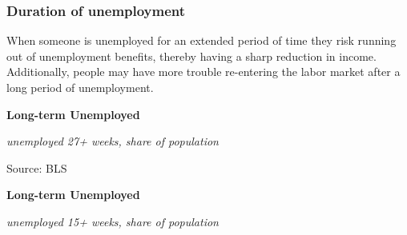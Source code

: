 \documentclass{report}
\makeatletter
\newcommand{\tbllink}[1]{\href{https://raw.githubusercontent.com/bdecon/US-chartbook/master/chartbook/data/#1}{\faTable}}
\newcommand*\short[1]{\expandafter\@gobbletwo\number\numexpr#1\relax}
\newcommand{\shdateaxisticks}{
		date coordinates in=x, axis line style={draw=none},
		xmax={2021-01-01},
		max space between ticks=40,	    
		xtick={{1990-01-01}, {1995-01-01}, {2000-01-01}, 
			{2005-01-01}, {2010-01-01}, {2015-01-01}, {2020-01-01}},
		minor xtick={},
		enlarge y limits={0.06}, enlarge x limits={0.01},
		}
\newcommand{\bbar}[2]{extra #1 ticks = {{#2}}, extra #1 tick labels = ,
		extra #1 tick style = {grid=major, grid style={thick, black!25}},}
\newcommand{\stdline}[4]{\addplot[very thick, no markers, color=#1] 
		table [x=#2, y=#3, col sep=comma] {#4};	}
\newcommand{\rbars}{
		\fill[color=black!10] (axis cs:{1990-07-01},\pgfkeysvalueof{/pgfplots/ymin}) rectangle 
			(axis cs:{1991-03-01}, \pgfkeysvalueof{/pgfplots/ymax});
		\fill[color=black!10] (axis cs:{2007-12-01},\pgfkeysvalueof{/pgfplots/ymin}) rectangle 
			(axis cs:{2009-07-01}, \pgfkeysvalueof{/pgfplots/ymax});
		\fill[color=black!10] (axis cs:{2001-03-01},\pgfkeysvalueof{/pgfplots/ymin}) rectangle 
			(axis cs:{2001-11-01}, \pgfkeysvalueof{/pgfplots/ymax});
		\fill[color=black!10] (axis cs:{2020-02-01},\pgfkeysvalueof{/pgfplots/ymin}) rectangle 
			(axis cs:{2020-09-01}, \pgfkeysvalueof{/pgfplots/ymax});}
\makeatother
\begin{document}
{{{{{{{{{\newpage

\begin{minipage}{0.76\textwidth} 
\subsubsection*{\color{black!70} \seriffont Duration of unemployment}
\small When someone is unemployed for an extended period of time they risk running out of unemployment benefits, thereby having a sharp reduction in income. Additionally, people may have more trouble re-entering the labor market after a long period of unemployment. \\


\end{minipage}

\vspace{3mm}

\begin{minipage}{0.37\textwidth}
\normalsize \textbf{Long-term Unemployed}

\footnotesize{\textit{unemployed 27+ weeks, share of population}}

\hspace*{-2mm} 

\footnotesize{Source: BLS} \hfill \tbllink{ltu.csv}
\end{minipage} \hspace{5mm}
\begin{minipage}{0.37\textwidth}
\normalsize \textbf{Long-term Unemployed}

\footnotesize{\textit{unemployed 15+ weeks, share of population}}

\hspace*{-2mm} 


\end{minipage}}}}}}}}}}
\end{document}
